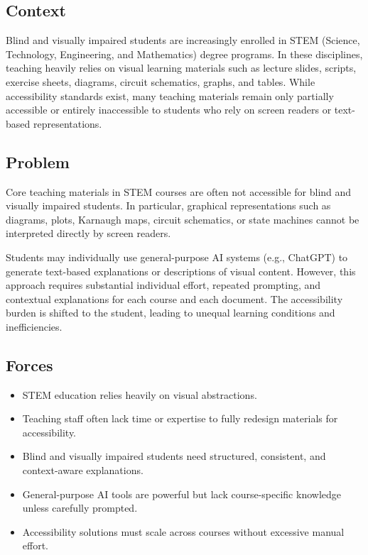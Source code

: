 \patternSix

\subsection*{Context}

Blind and visually impaired students are increasingly enrolled in STEM (Science, Technology, Engineering, and Mathematics) degree programs. In these disciplines, teaching heavily relies on visual learning materials such as lecture slides, scripts, exercise sheets, diagrams, circuit schematics, graphs, and tables. While accessibility standards exist, many teaching materials remain only partially accessible or entirely inaccessible to students who rely on screen readers or text-based representations.
    
\subsection*{Problem}

\begin{itshape}
Core teaching materials in STEM courses are often not accessible for blind and visually impaired students. In particular, graphical representations such as diagrams, plots, Karnaugh maps, circuit schematics, or state machines cannot be interpreted directly by screen readers.

Students may individually use general-purpose AI systems (e.g., ChatGPT) to generate text-based explanations or descriptions of visual content. However, this approach requires substantial individual effort, repeated prompting, and contextual explanations for each course and each document. The accessibility burden is shifted to the student, leading to unequal learning conditions and inefficiencies.

\end{itshape}

\subsection*{Forces}

\begin{itemize}
    \item STEM education relies heavily on visual abstractions.
    
    \item Teaching staff often lack time or expertise to fully redesign materials for accessibility.
    
    \item Blind and visually impaired students need structured, consistent, and context-aware explanations.

    \item General-purpose AI tools are powerful but lack course-specific knowledge unless carefully prompted.

    \item Accessibility solutions must scale across courses without excessive manual effort.
\end{itemize}

